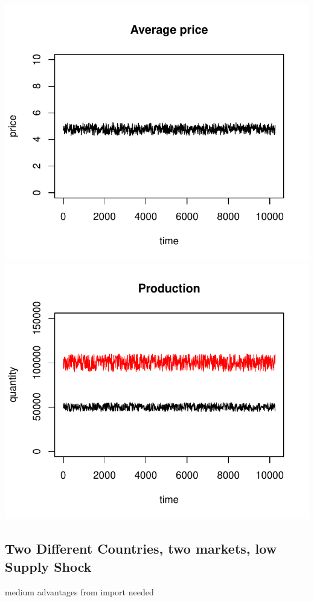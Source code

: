 \documentclass{article}
\begin{document}
\noindent
\vskip-5mm
\hskip-1cm
\includegraphics[scale=0.5]{fig_case02_price}
\includegraphics[scale=0.5]{fig_case02_production}

\newpage


\subsection{Two Different Countries, two markets, low Supply Shock}
medium advantages from import needed
\end{document}
